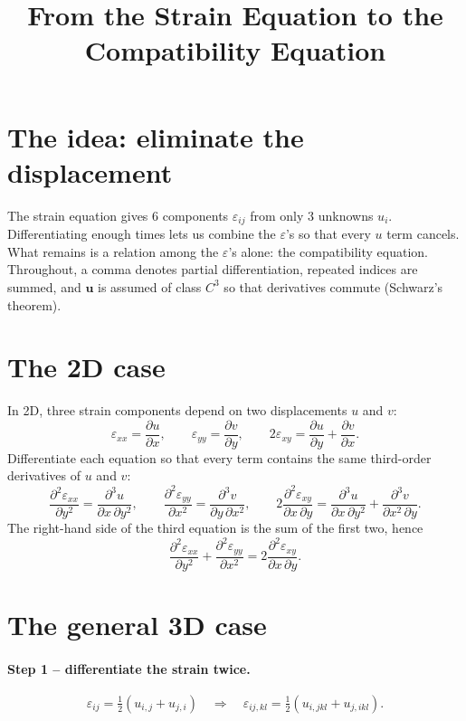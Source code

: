 \documentclass[11pt,a4paper]{article}
\title{From the Strain Equation to the Compatibility Equation}
\author{}
\date{}
\newcommand{\eps}{\varepsilon}
\begin{document}
\maketitle

\section*{The idea: eliminate the displacement}

The strain equation gives $6$ components $\eps_{ij}$ from only $3$ unknowns $u_i$.
Differentiating enough times lets us combine the $\eps$'s so that every $u$ term cancels.
What remains is a relation among the $\eps$'s alone: the compatibility equation.
Throughout, a comma denotes partial differentiation, repeated indices are summed, and $\boldsymbol u$ is assumed of class $C^3$ so that derivatives commute (Schwarz's theorem).

\section{The 2D case}

In 2D, three strain components depend on two displacements $u$ and $v$:
\[
  \eps_{xx}=\frac{\partial u}{\partial x},\qquad
  \eps_{yy}=\frac{\partial v}{\partial y},\qquad
  2\eps_{xy}=\frac{\partial u}{\partial y}+\frac{\partial v}{\partial x}.
\]
Differentiate each equation so that every term contains the same third-order derivatives of $u$ and $v$:
\[
  \frac{\partial^2\eps_{xx}}{\partial y^2}=\frac{\partial^3 u}{\partial x\,\partial y^2},\qquad
  \frac{\partial^2\eps_{yy}}{\partial x^2}=\frac{\partial^3 v}{\partial y\,\partial x^2},\qquad
  2\frac{\partial^2\eps_{xy}}{\partial x\,\partial y}=\frac{\partial^3 u}{\partial x\,\partial y^2}+\frac{\partial^3 v}{\partial x^2\,\partial y}.
\]
The right-hand side of the third equation is the sum of the first two, hence
\[
  \boxed{\frac{\partial^2\eps_{xx}}{\partial y^2}+\frac{\partial^2\eps_{yy}}{\partial x^2}=2\frac{\partial^2\eps_{xy}}{\partial x\,\partial y}.}
\]

\section{The general 3D case}

\paragraph{Step 1 -- differentiate the strain twice.}
\[
  \eps_{ij}=\tfrac12\left(u_{i,j}+u_{j,i}\right)
  \quad\Longrightarrow\quad
  \eps_{ij,kl}=\tfrac12\left(u_{i,jkl}+u_{j,ikl}\right).
\]
\end{document}
